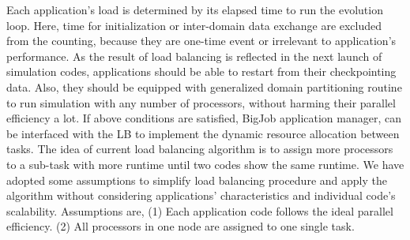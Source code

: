 \documentclass[conference,final]{IEEEtran}
\begin{document}

Each application's load is determined by its elapsed time to run the
evolution loop. Here, time for initialization or inter-domain data
exchange are excluded from the counting, because they are one-time
event or irrelevant to application's performance. As the result of
load balancing is reflected in the next launch of simulation codes,
applications should be able to restart from their checkpointing data.
Also, they should be equipped with generalized domain partitioning
routine to run simulation with any number of processors, without
harming their parallel efficiency a lot. If above conditions are
satisfied, BigJob application manager, can be interfaced with the LB
to implement the dynamic resource allocation between tasks.
The idea of current load balancing algorithm is to assign more processors to a sub-task with more runtime until two codes show the same runtime. We have adopted some assumptions to simplify load balancing procedure and apply the algorithm without considering applications' characteristics and individual code's scalability. Assumptions are, (1) Each application code follows the ideal parallel efficiency.  (2) All processors in one node are assigned to one single task.



\end{document}
